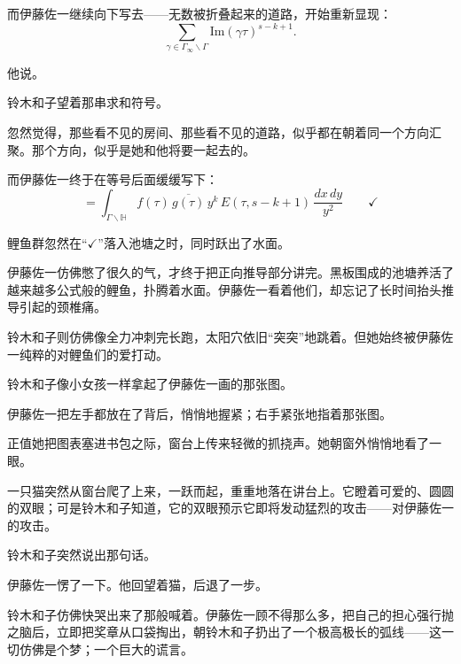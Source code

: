 而伊藤佐一继续向下写去——无数被折叠起来的道路，开始重新显现：
\[
\sum_{\gamma\in\Gamma_\infty\backslash\Gamma}
\mathrm{Im}(\gamma\tau)^{s-k+1}.
\]


他说。


铃木和子望着那串求和符号。

忽然觉得，那些看不见的房间、那些看不见的道路，似乎都在朝着同一个方向汇聚。那个方向，似乎是她和他将要一起去的。

而伊藤佐一终于在等号后面缓缓写下：
\[
\boxed{
=
\int_{\Gamma\backslash\mathbb{H}}
f(\tau)\,\overline{g(\tau)}\,y^k\,
E(\tau,s-k+1)\,
\frac{dx\,dy}{y^2}
\qquad \checkmark
}
\]

鲤鱼群忽然在“\(\checkmark\)”落入池塘之时，同时跃出了水面。

伊藤佐一仿佛憋了很久的气，才终于把正向推导部分讲完。黑板围成的池塘养活了越来越多公式般的鲤鱼，扑腾着水面。伊藤佐一看着他们，却忘记了长时间抬头推导引起的颈椎痛。

铃木和子则仿佛像全力冲刺完长跑，太阳穴依旧“突突”地跳着。但她始终被伊藤佐一纯粹的对鲤鱼们的爱打动。


铃木和子像小女孩一样拿起了伊藤佐一画的那张图。


伊藤佐一把左手都放在了背后，悄悄地握紧；右手紧张地指着那张图。



正值她把图表塞进书包之际，窗台上传来轻微的抓挠声。她朝窗外悄悄地看了一眼。

一只猫突然从窗台爬了上来，一跃而起，重重地落在讲台上。它瞪着可爱的、圆圆的双眼；可是铃木和子知道，它的双眼预示它即将发动猛烈的攻击——对伊藤佐一的攻击。

铃木和子突然说出那句话。


伊藤佐一愣了一下。他回望着猫，后退了一步。


铃木和子仿佛快哭出来了那般喊着。伊藤佐一顾不得那么多，把自己的担心强行抛之脑后，立即把奖章从口袋掏出，朝铃木和子扔出了一个极高极长的弧线——这一切仿佛是个梦；一个巨大的谎言。

